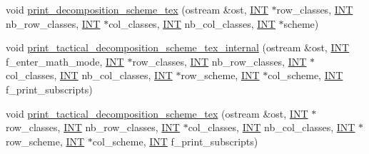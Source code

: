 \begin{DoxyCompactItemize}
\item 
void \mbox{\hyperlink{classpartitionstack_a4fcb124af962ca668742c4165ab77a90}{print\+\_\+decomposition\+\_\+scheme\+\_\+tex}} (ostream \&ost, \mbox{\hyperlink{galois_8h_a09fddde158a3a20bd2dcadb609de11dc}{I\+NT}} $\ast$row\+\_\+classes, \mbox{\hyperlink{galois_8h_a09fddde158a3a20bd2dcadb609de11dc}{I\+NT}} nb\+\_\+row\+\_\+classes, \mbox{\hyperlink{galois_8h_a09fddde158a3a20bd2dcadb609de11dc}{I\+NT}} $\ast$col\+\_\+classes, \mbox{\hyperlink{galois_8h_a09fddde158a3a20bd2dcadb609de11dc}{I\+NT}} nb\+\_\+col\+\_\+classes, \mbox{\hyperlink{galois_8h_a09fddde158a3a20bd2dcadb609de11dc}{I\+NT}} $\ast$scheme)
\item 
void \mbox{\hyperlink{classpartitionstack_aa79ebae6c167b8517972eb5490298856}{print\+\_\+tactical\+\_\+decomposition\+\_\+scheme\+\_\+tex\+\_\+internal}} (ostream \&ost, \mbox{\hyperlink{galois_8h_a09fddde158a3a20bd2dcadb609de11dc}{I\+NT}} f\+\_\+enter\+\_\+math\+\_\+mode, \mbox{\hyperlink{galois_8h_a09fddde158a3a20bd2dcadb609de11dc}{I\+NT}} $\ast$row\+\_\+classes, \mbox{\hyperlink{galois_8h_a09fddde158a3a20bd2dcadb609de11dc}{I\+NT}} nb\+\_\+row\+\_\+classes, \mbox{\hyperlink{galois_8h_a09fddde158a3a20bd2dcadb609de11dc}{I\+NT}} $\ast$col\+\_\+classes, \mbox{\hyperlink{galois_8h_a09fddde158a3a20bd2dcadb609de11dc}{I\+NT}} nb\+\_\+col\+\_\+classes, \mbox{\hyperlink{galois_8h_a09fddde158a3a20bd2dcadb609de11dc}{I\+NT}} $\ast$row\+\_\+scheme, \mbox{\hyperlink{galois_8h_a09fddde158a3a20bd2dcadb609de11dc}{I\+NT}} $\ast$col\+\_\+scheme, \mbox{\hyperlink{galois_8h_a09fddde158a3a20bd2dcadb609de11dc}{I\+NT}} f\+\_\+print\+\_\+subscripts)
\item 
void \mbox{\hyperlink{classpartitionstack_a9ceab7213afcbf44b98106f51cb05c8d}{print\+\_\+tactical\+\_\+decomposition\+\_\+scheme\+\_\+tex}} (ostream \&ost, \mbox{\hyperlink{galois_8h_a09fddde158a3a20bd2dcadb609de11dc}{I\+NT}} $\ast$row\+\_\+classes, \mbox{\hyperlink{galois_8h_a09fddde158a3a20bd2dcadb609de11dc}{I\+NT}} nb\+\_\+row\+\_\+classes, \mbox{\hyperlink{galois_8h_a09fddde158a3a20bd2dcadb609de11dc}{I\+NT}} $\ast$col\+\_\+classes, \mbox{\hyperlink{galois_8h_a09fddde158a3a20bd2dcadb609de11dc}{I\+NT}} nb\+\_\+col\+\_\+classes, \mbox{\hyperlink{galois_8h_a09fddde158a3a20bd2dcadb609de11dc}{I\+NT}} $\ast$row\+\_\+scheme, \mbox{\hyperlink{galois_8h_a09fddde158a3a20bd2dcadb609de11dc}{I\+NT}} $\ast$col\+\_\+scheme, \mbox{\hyperlink{galois_8h_a09fddde158a3a20bd2dcadb609de11dc}{I\+NT}} f\+\_\+print\+\_\+subscripts)
\item 

\end{DoxyCompactItemize}
